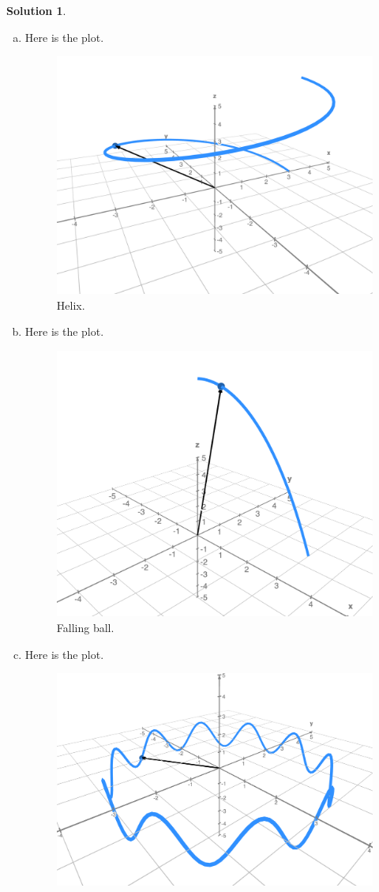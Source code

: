 \documentclass[12pt]{report} %
\theoremstyle{definition}
\newtheorem{solution}{Solution}
\begin{document}
\begin{solution}~
\begin{enumerate}[(a)]
    \item Here is the plot.
    \begin{figure}[H]
        \centering
        \includegraphics[width=.6\textwidth]{Images/helix.png}
        \caption{Helix.}
    \end{figure}
    \item Here is the plot.
    \begin{figure}[H]
        \centering
        \includegraphics[width=.6\textwidth]{Images/falling_ball.png}
        \caption{Falling ball.}
    \end{figure}
    \item Here is the plot.
    \begin{figure}[H]
        \centering
        \includegraphics[width=.6\textwidth]{Images/perturbed_orbiter.png}

\end{figure}
\end{enumerate}
\end{solution}
\end{document}
